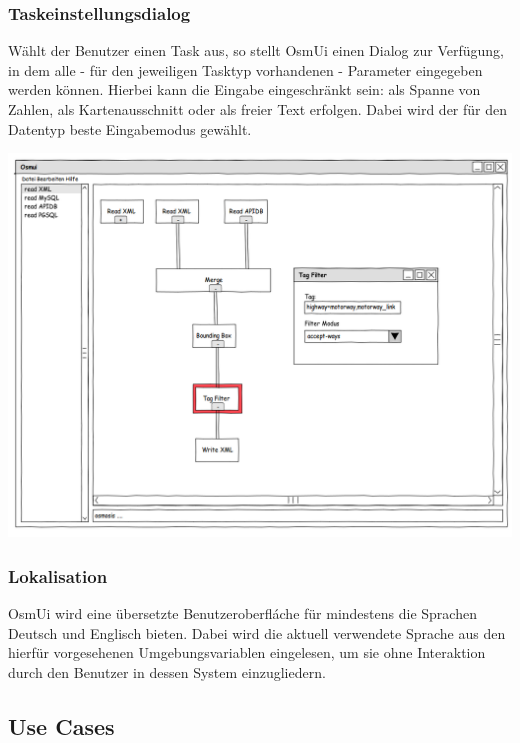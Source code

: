 \documentclass[a4paper,10pt]{scrartcl}
\begin{document}
\subsubsection{Taskeinstellungsdialog}
Wählt der Benutzer einen Task aus, so stellt OsmUi einen Dialog zur Verfügung, in dem alle - für den jeweiligen Tasktyp vorhandenen - Parameter eingegeben werden können.
Hierbei kann die Eingabe eingeschränkt sein: als Spanne von Zahlen, als Kartenausschnitt oder als freier Text erfolgen. Dabei wird der für
den Datentyp beste Eingabemodus gewählt.\\
\begin{center}
\includegraphics[width=15cm]{ui_prototype/OsmUi_Parameter_Optionen.png}
\end{center}
\subsubsection{Lokalisation}
OsmUi wird eine übersetzte Benutzeroberfláche für mindestens die Sprachen Deutsch und Englisch bieten. Dabei wird die aktuell verwendete
Sprache aus den hierfür vorgesehenen Umgebungsvariablen eingelesen, um sie ohne Interaktion durch den Benutzer in dessen System einzugliedern.

\subsection{Use Cases}
\end{document}
